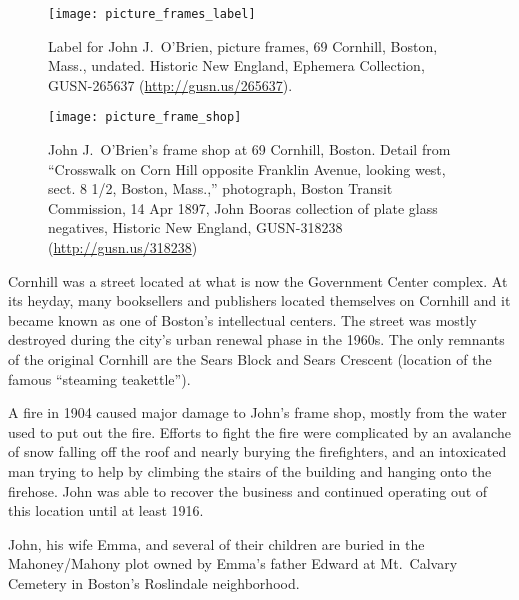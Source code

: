 \begin{figure}
\centering
\texttt{[image: picture\_frames\_label]}
\caption{Label for John J.\ O'Brien, picture frames, 69 Cornhill, Boston, Mass., undated. Historic New England, Ephemera Collection, GUSN-265637 (\url{http://gusn.us/265637}).}
\end{figure}

\begin{figure}
	\centering
	\texttt{[image: picture\_frame\_shop]}
	\caption{John J.\ O'Brien's frame shop at 69 Cornhill, Boston. Detail from ``Crosswalk on Corn Hill opposite Franklin Avenue, looking west, sect. 8 1/2, Boston, Mass.,'' photograph, Boston Transit Commission, 14 Apr 1897, John Booras collection of plate glass negatives, Historic New England, GUSN-318238 (\url{http://gusn.us/318238}) }
\end{figure}

Cornhill was a street located at what is now the Government Center complex. At its heyday, many booksellers and publishers located themselves on Cornhill and it became known as one of Boston's intellectual centers.\cite{Cornhill} The street was mostly destroyed during the city's urban renewal phase in the 1960s. The only remnants of the original Cornhill are the Sears Block and Sears Crescent (location of the famous ``steaming teakettle'').\cite{Cornhill}

A fire in 1904 caused major damage to John's frame shop, mostly from the water used to put out the fire. Efforts to fight the fire were complicated by an avalanche of snow falling off the roof and nearly burying the firefighters, and an intoxicated man trying to help by climbing the stairs of the building and hanging onto the firehose.\cite{FrameShopFire} John was able to recover the business and continued operating out of this location until at least 1916.\cite{John3OBrien1916}

John, his wife Emma, and several of their children are buried in the Mahoney/Mahony plot owned by Emma's father Edward at Mt.\ Calvary Cemetery in Boston's Roslindale neighborhood.\cite{John3OBrienBurial}

